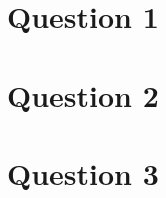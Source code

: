 \documentclass[10pt]{article}
\begin{document}

\maketitle

\pagebreak


\section{Question 1}

\section{Question 2}

\section{Question 3}
\end{document}

